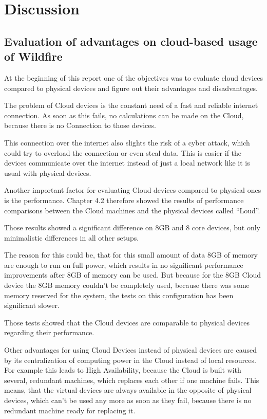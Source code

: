 
\chapter{Discussion}

\section{Evaluation of advantages on cloud-based usage of Wildfire}

At the beginning of this report one of the objectives was to evaluate cloud devices compared to physical devices and figure out their advantages and disadvantages.

The problem of Cloud devices is the constant need of a fast and reliable internet connection. As soon as this fails, no calculations can be made on the Cloud, because there is no Connection to those devices.

This connection over the internet also slights the risk of a cyber attack, which could try to overload the connection or even steal data. This is easier if the devices communicate over the internet instead of just a local network like it is usual with physical devices.

Another important factor for evaluating Cloud devices compared to physical ones is the performance. Chapter 4.2 therefore showed the results of performance comparisons between the Cloud machines and the physical devices called ``Loud''.

Those results showed a significant difference on 8GB and 8 core devices, but only minimalistic differences in all other setups.

The reason for this could be, that for this small amount of data 8GB of memory are enough to run on full power, which results in no significant performance improvements after 8GB of memory can be used. But because for the 8GB Cloud device the 8GB memory couldn't be completely used, because there was some memory reserved for the system, the tests on this configuration has been significant slower.

Those tests showed that the Cloud devices are comparable to physical devices regarding their performance.

Other advantages for using Cloud Devices instead of physical devices are caused by its centralization of computing power in the Cloud instead of local resources. For example this leads to High Availability, because the Cloud is built with several, redundant machines, which replaces each other if one machine fails. This means, that the virtual devices are always available in the opposite of physical devices, which can't be used any more as soon as they fail, because there is no redundant machine ready for replacing it.


